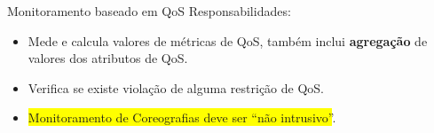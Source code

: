 \documentclass[xcolor=svgnames]{beamer}
\begin{document}






    \begin{frame}{Monitoramento baseado em QoS}
	Responsabilidades:
        \begin{itemize}
          \item Mede e calcula valores de métricas de QoS, também inclui \textbf{ agregação} de valores dos atributos de QoS.
          \item Verifica se existe violação de alguma restrição de QoS.
          \item \colorbox{yellow}{ Monitoramento de Coreografias deve ser ``não intrusivo''}.
        \end{itemize}
    \end{frame}
\end{document}
